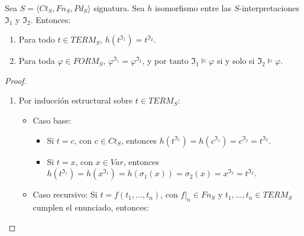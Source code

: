 \begin{theorem}
Sea $S = \langle Ct_{S}, Fn_{S}, Pd_{S}\rangle$ signatura. Sea $h$ isomorfismo entre las $S$-interpretaciones $\mathfrak{I}_1$ y $\mathfrak{I}_2$. Entonces:
\begin{enumerate}
    \item Para todo $t \in TERM_S$, $h(t^{\mathfrak{I}_1}) = t^{\mathfrak{I}_2}$.
    \item Para toda $\varphi \in FORM_S$, $\varphi^{\mathfrak{I}_1} = \varphi^{\mathfrak{I}_2}$, y por tanto $\mathfrak{I}_1 \vDash \varphi$ si y solo si $\mathfrak{I}_2 \vDash \varphi$.
\end{enumerate}
\end{theorem}
\begin{proof} \mbox{}
\begin{enumerate}
    \item Por inducción estructural sobre $t \in TERM_S$:
        \begin{itemize}
            \item Caso base:
                \begin{itemize}
                \item Si $t = c$, con $c \in Ct_S$, entonces $h(t^{\mathfrak{I}_1}) = h(c^{\mathfrak{I}_1}) = c^{\mathfrak{I}_2} = t^{\mathfrak{I}_2}$.
                \item Si $t = x$, con $x \in Var$, entonces $h(t^{\mathfrak{I}_1}) = h(x^{\mathfrak{I}_1}) = h(\sigma_1(x)) = \sigma_2(x) = x^{\mathfrak{I}_2} = t^{\mathfrak{I}_2}$.
                 \end{itemize}
            \item Caso recursivo: Si $t = f(t_1, \dots, t_n)$, con $f|_n \in Fn_S$ y $t_1, \dots, t_n \in TERM_S$ cumplen el enunciado, entonces: 
            

\end{itemize}
\end{enumerate}
\end{proof}
